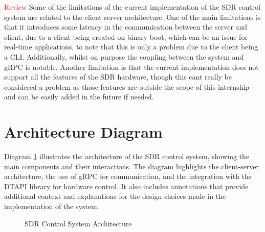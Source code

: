 
\textcolor{Red}{Review}
Some of the limitations of the current implementation of the \gls{SDR} control
system are related to the client server architecture. One of the main
limitations is that it introduces some latency in the communication between the
server and client, due to a client being created on binary boot, which can be an
issue for real-time applications, to note that this is only a problem due to the client being a \gls{CLI}.
Additionally, whilst on purpose the coupling between the system and \gls{gRPC}
is notable. Another limitation is that the current implementation does not
support all the features of the \gls{SDR} hardware, though this cant really be
considered a problem as those features are outside the scope of this internship
and can be easily added in the future if needed.

\section{Architecture Diagram}
Diagram \ref{fig:sdr-control-architecture} illustrates the architecture of the
\gls{SDR} control system, showing the main components and their interactions.
The diagram highlights the client-server architecture, the use of \gls{gRPC}
for communication, and the integration with the \gls{DTAPI} library for
hardware control. It also includes annotations that provide additional context
and explanations for the design choices made in the implementation of the
system.

\begin{figure}[htbp]
  \centering
  
  \caption{SDR Control System Architecture}
  \label{fig:sdr-control-architecture}
\end{figure}

